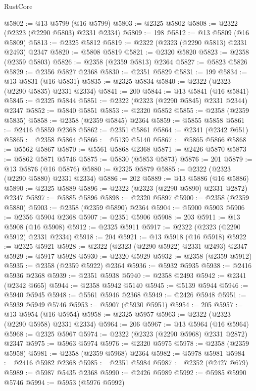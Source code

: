 \begin{lexlean}{RustCore}
\begin{coremodule}
@5802 := @13 @5799 (@16 @5799)
@5803 := @2325 @5802
@5808 := @2322 (@2323 (@2290 @5803) @2331 @2334)
@5809 := 198
@5812 := @13 @5809 (@16 @5809)
@5813 := @2325 @5812
@5819 := @2322 (@2323 (@2290 @5813) @2331 @2493) @2347
@5820 := @5808 @5819
@5821 := @2320 @5820
@5823 := @2358 (@2359 @5803)
@5826 := @2358 (@2359 @5813) @2364
@5827 := @5823 @5826
@5829 := @2356 @5827 @2368
@5830 := @2351 @5829
@5831 := 199
@5834 := @13 @5831 (@16 @5831)
@5835 := @2325 @5834
@5840 := @2322 (@2323 (@2290 @5835) @2331 @2334)
@5841 := 200
@5844 := @13 @5841 (@16 @5841)
@5845 := @2325 @5844
@5851 := @2322 (@2323 (@2290 @5845) @2331 @2344) @2347
@5852 := @5840 @5851
@5853 := @2320 @5852
@5855 := @2358 (@2359 @5835)
@5858 := @2358 (@2359 @5845) @2364
@5859 := @5855 @5858
@5861 := @2416 @5859 @2368
@5862 := @2351 @5861
@5864 := @2341 (@2342 @651)
@5865 := @2358 @5864
@5866 := @5139 @5140
@5867 := @5865 @5866
@5868 := @5562 @5867
@5870 := @5561 @5868 @2368
@5871 := @2426 @5870
@5873 := @5862 @5871 @5746
@5875 := @5830 (@5853 @5873)
@5876 := 201
@5879 := @13 @5876 (@16 @5876)
@5880 := @2325 @5879
@5885 := @2322 (@2323 (@2290 @5880) @2331 @2334)
@5886 := 202
@5889 := @13 @5886 (@16 @5886)
@5890 := @2325 @5889
@5896 := @2322 (@2323 (@2290 @5890) @2331 @2872) @2347
@5897 := @5885 @5896
@5898 := @2320 @5897
@5900 := @2358 (@2359 @5880)
@5903 := @2358 (@2359 @5890) @2364
@5904 := @5900 @5903
@5906 := @2356 @5904 @2368
@5907 := @2351 @5906
@5908 := 203
@5911 := @13 @5908 (@16 @5908)
@5912 := @2325 @5911
@5917 := @2322 (@2323 (@2290 @5912) @2331 @2334)
@5918 := 204
@5921 := @13 @5918 (@16 @5918)
@5922 := @2325 @5921
@5928 := @2322 (@2323 (@2290 @5922) @2331 @2493) @2347
@5929 := @5917 @5928
@5930 := @2320 @5929
@5932 := @2358 (@2359 @5912)
@5935 := @2358 (@2359 @5922) @2364
@5936 := @5932 @5935
@5938 := @2416 @5936 @2368
@5939 := @2351 @5938
@5940 := @2358 @2493
@5942 := @2341 (@2342 @665)
@5944 := @2358 @5942 @5140
@5945 := @5139 @5944
@5946 := @5940 @5945
@5948 := @5561 @5946 @2368
@5949 := @2426 @5948
@5951 := @5939 @5949 @5746
@5953 := @5907 (@5930 @5951)
@5954 := 205
@5957 := @13 @5954 (@16 @5954)
@5958 := @2325 @5957
@5963 := @2322 (@2323 (@2290 @5958) @2331 @2334)
@5964 := 206
@5967 := @13 @5964 (@16 @5964)
@5968 := @2325 @5967
@5974 := @2322 (@2323 (@2290 @5968) @2331 @2872) @2347
@5975 := @5963 @5974
@5976 := @2320 @5975
@5978 := @2358 (@2359 @5958)
@5981 := @2358 (@2359 @5968) @2364
@5982 := @5978 @5981
@5984 := @2416 @5982 @2368
@5985 := @2351 @5984
@5987 := @2352 (@2427 @679)
@5989 := @5987 @5435 @2368
@5990 := @2426 @5989
@5992 := @5985 @5990 @5746
@5994 := @5953 (@5976 @5992)

\end{coremodule}
\end{lexlean}
